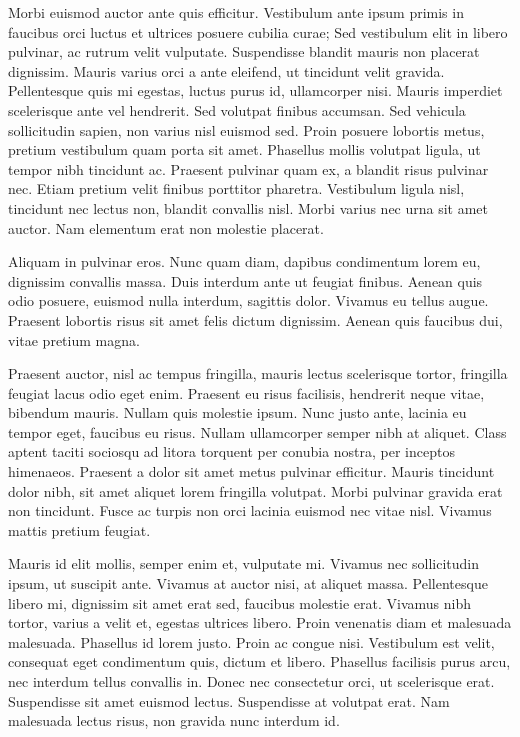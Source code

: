 Morbi euismod auctor ante quis efficitur. Vestibulum ante ipsum primis in faucibus orci luctus et ultrices posuere cubilia curae; Sed vestibulum elit in libero pulvinar, ac rutrum velit vulputate. Suspendisse blandit mauris non placerat dignissim. Mauris varius orci a ante eleifend, ut tincidunt velit gravida. Pellentesque quis mi egestas, luctus purus id, ullamcorper nisi. Mauris imperdiet scelerisque ante vel hendrerit. Sed volutpat finibus accumsan. Sed vehicula sollicitudin sapien, non varius nisl euismod sed. Proin posuere lobortis metus, pretium vestibulum quam porta sit amet. Phasellus mollis volutpat ligula, ut tempor nibh tincidunt ac. Praesent pulvinar quam ex, a blandit risus pulvinar nec. Etiam pretium velit finibus porttitor pharetra. Vestibulum ligula nisl, tincidunt nec lectus non, blandit convallis nisl. Morbi varius nec urna sit amet auctor. Nam elementum erat non molestie placerat.

Aliquam in pulvinar eros. Nunc quam diam, dapibus condimentum lorem eu, dignissim convallis massa. Duis interdum ante ut feugiat finibus. Aenean quis odio posuere, euismod nulla interdum, sagittis dolor. Vivamus eu tellus augue. Praesent lobortis risus sit amet felis dictum dignissim. Aenean quis faucibus dui, vitae pretium magna.

Praesent auctor, nisl ac tempus fringilla, mauris lectus scelerisque tortor, fringilla feugiat lacus odio eget enim. Praesent eu risus facilisis, hendrerit neque vitae, bibendum mauris. Nullam quis molestie ipsum. Nunc justo ante, lacinia eu tempor eget, faucibus eu risus. Nullam ullamcorper semper nibh at aliquet. Class aptent taciti sociosqu ad litora torquent per conubia nostra, per inceptos himenaeos. Praesent a dolor sit amet metus pulvinar efficitur. Mauris tincidunt dolor nibh, sit amet aliquet lorem fringilla volutpat. Morbi pulvinar gravida erat non tincidunt. Fusce ac turpis non orci lacinia euismod nec vitae nisl. Vivamus mattis pretium feugiat.

Mauris id elit mollis, semper enim et, vulputate mi. Vivamus nec sollicitudin ipsum, ut suscipit ante. Vivamus at auctor nisi, at aliquet massa. Pellentesque libero mi, dignissim sit amet erat sed, faucibus molestie erat. Vivamus nibh tortor, varius a velit et, egestas ultrices libero. Proin venenatis diam et malesuada malesuada. Phasellus id lorem justo. Proin ac congue nisi. Vestibulum est velit, consequat eget condimentum quis, dictum et libero. Phasellus facilisis purus arcu, nec interdum tellus convallis in. Donec nec consectetur orci, ut scelerisque erat. Suspendisse sit amet euismod lectus. Suspendisse at volutpat erat. Nam malesuada lectus risus, non gravida nunc interdum id.

